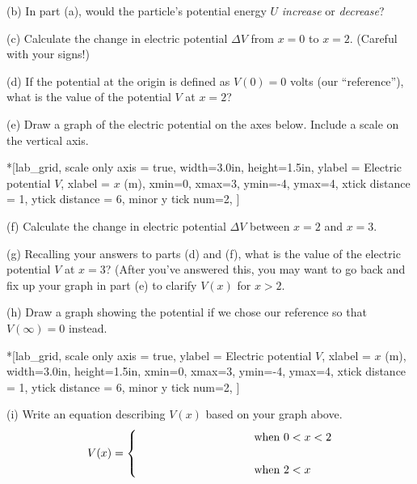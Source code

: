 (b) In part (a), would the particle's potential energy $U$ \textit{increase} or \textit{decrease}?
\answerspace{0.7in}

(c) Calculate the change in electric potential $\Delta V$ from $x=0$ to $x=2$. (Careful with your signs!)
\answerspace{0.9in}

(d) If the potential at the origin is defined as $V(0)=0$ volts (our ``reference''), what is the value of the potential $V$ at $x=2$?
\answerspace{0.7in}

\pagebreak
(e) Draw a graph of the electric potential on the axes below.  Include a scale on the vertical axis.

\begin{lab_axis}*[lab_grid,
	scale only axis = true,
	width={3.0in}, height={1.5in},
	ylabel = {Electric potential $V$},
	xlabel = {$x$ (m)},
	xmin=0, xmax=3,
	ymin=-4, ymax=4,
	xtick distance = 1,
	ytick distance = 6,
	minor y tick num=2,
]
\end{lab_axis}

(f) Calculate the change in electric potential $\Delta V$ between $x=2$ and $x=3$.
\answerspace{0.5in}

(g) Recalling your answers to parts (d) and (f), what is the value of the electric potential $V$ at $x=3$?  (After you've answered this, you may want to go back and fix up your graph in part (e) to clarify $V(x)$ for $x>2$.
\answerspace{0.5in}

(h) Draw a graph showing the potential if we chose our reference so that $V(\infty)=0$ instead.  

\begin{lab_axis}*[lab_grid,
	scale only axis = true,
	ylabel = {Electric potential $V$},
	xlabel = {$x$ (m)},
	width={3.0in}, height={1.5in},
	xmin=0, xmax=3,
	ymin=-4, ymax=4,
	xtick distance = 1,
	ytick distance = 6,
	minor y tick num=2,
]
\end{lab_axis}

(i) Write an equation describing $V(x)$ based on your graph above.
\begin{displaymath}
V(x) = \begin{cases}
        \rule{1.3in}{0in}  & \textrm{when } 0<x<2\\
        \\
        \hspace{1.3in} & \textrm{when }  2 < x
        \end{cases}
\end{displaymath}
\answerspace{0.1in}

